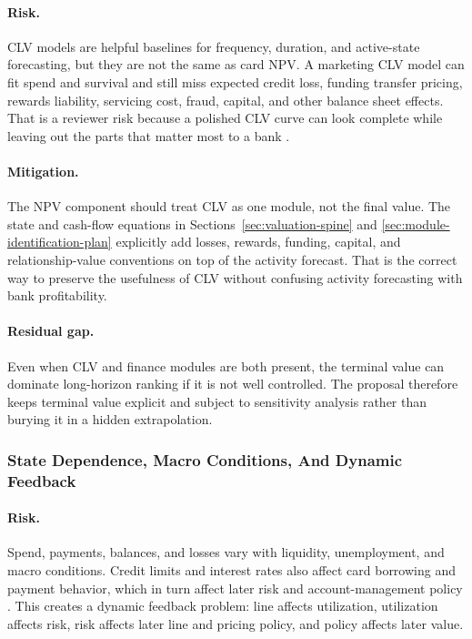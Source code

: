 \documentclass[11pt]{article}
\newcommand{\1}{\mathbf{1}}
\begin{document}
\paragraph{Risk.}
CLV models are helpful baselines for frequency, duration, and active-state
forecasting, but they are not the same as card NPV. A marketing CLV model can
fit spend and survival and still miss expected credit loss, funding transfer
pricing, rewards liability, servicing cost, fraud, capital, and other balance
sheet effects. That is a reviewer risk because a polished CLV curve can look
complete while leaving out the parts that matter most to a bank
\citep{berger1998clv,rust2004return,venkatesan2004clv,schmittlein1987counting,
fader2005bgnbd,bolton1998duration}.

\paragraph{Mitigation.}
The NPV component should treat CLV as one module, not the final value. The
state and cash-flow equations in Sections~\ref{sec:valuation-spine} and
\ref{sec:module-identification-plan} explicitly add losses, rewards, funding,
capital, and relationship-value conventions on top of the activity forecast.
That is the correct way to preserve the usefulness of CLV without confusing
activity forecasting with bank profitability.

\paragraph{Residual gap.}
Even when CLV and finance modules are both present, the terminal value can
dominate long-horizon ranking if it is not well controlled. The proposal
therefore keeps terminal value explicit and subject to sensitivity analysis
rather than burying it in a hidden extrapolation.

\subsubsection{State Dependence, Macro Conditions, And Dynamic Feedback}

\paragraph{Risk.}
Spend, payments, balances, and losses vary with liquidity, unemployment, and
macro conditions. Credit limits and interest rates also affect card borrowing
and payment behavior, which in turn affect later risk and account-management
policy \citep{ganong2019unemployment,gross2001liquidity,johnson2004rebates,
baker2020epidemic}. This creates a dynamic feedback problem: line affects
utilization, utilization affects risk, risk affects later line and pricing
policy, and policy affects later value.
\end{document}
